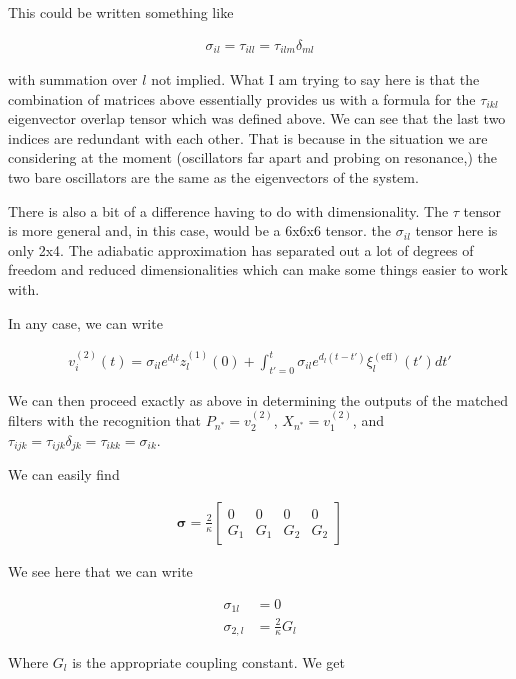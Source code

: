 \documentclass[12pt]{article}
\newcommand{\bv}[1]{\boldsymbol{#1}}
\begin{document}
This could be written something like

\begin{align}
\sigma_{il} = \tau_{ill} = \tau_{ilm} \delta_{ml}
\end{align}

with summation over $l$ not implied. What I am trying to say here is that the combination of matrices above essentially provides us with a formula for the $\tau_{ikl}$ eigenvector overlap tensor which was defined above. We can see that the last two indices are redundant with each other. That is because in the situation we are considering at the moment (oscillators far apart and probing on resonance,) the two bare oscillators are the same as the eigenvectors of the system. 

There is also a bit of a difference having to do with dimensionality. The $\tau$ tensor is more general and, in this case, would be a 6x6x6 tensor. the $\sigma_{il}$ tensor here is only 2x4. The adiabatic approximation has separated out a lot of degrees of freedom and reduced dimensionalities which can make some things easier to work with.

In any case, we can write

\begin{align}
v^{(2)}_i(t) = \sigma_{il}e^{d_l t}z^{(1)}_l(0) + \int_{t'=0}^t \sigma_{il} e^{d_l(t-t')}\xi^{(\text{eff})}_l(t') dt'
\end{align}

We can then proceed exactly as above in determining the outputs of the matched filters with the recognition that $P_{n^*} = v^{(2)}_2$, $X_{n^*} = v^{(2)}_1$, and $\tau_{ijk} = \tau_{ijk}\delta_{jk} = \tau_{ikk} =  \sigma_{ik}$.

We can easily find

\begin{align}
\bv{\sigma} = 
\frac{2}{\kappa}\begin{bmatrix}
0 & 0 & 0 & 0\\
G_1 & G_1 & G_2 & G_2
\end{bmatrix}
\end{align}

We see here that we can write 

\begin{align}
\sigma_{1l} &= 0\\
\sigma_{2,l} &= \frac{2}{\kappa}G_l
\end{align}

Where $G_l$ is the appropriate coupling constant. We get
\end{document}

